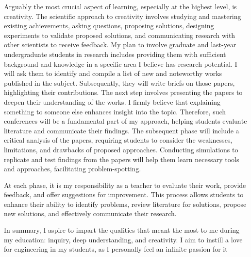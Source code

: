 Arguably the most crucial aspect of learning, especially at the highest level, is creativity. The scientific approach to creativity involves studying and mastering existing achievements, asking questions, proposing solutions, designing experiments to validate proposed solutions, and communicating research with other scientists to receive feedback. My plan to involve graduate and last-year undergraduate students in research includes providing them with sufficient background and knowledge in a specific area I believe has research potential. I will ask them to identify and compile a list of new and noteworthy works published in the subject. Subsequently, they will write briefs on those papers, highlighting their contributions. The next step involves presenting the papers to deepen their understanding of the works. I firmly believe that explaining something to someone else enhances insight into the topic. Therefore, such conferences will be a fundamental part of my approach, helping students evaluate literature and communicate their findings. The subsequent phase will include a critical analysis of the papers, requiring students to consider the weaknesses, limitations, and drawbacks of proposed approaches. Conducting simulations to replicate and test findings from the papers will help them learn necessary tools and approaches, facilitating problem-spotting.

At  each phase, it is my responsibility as a teacher to evaluate their work, provide feedback, and offer suggestions for improvement. This process allows students to enhance their ability to identify problems, review literature for solutions, propose new solutions, and effectively communicate their research.

In summary, I aspire to impart the qualities that meant the most to me during my education: inquiry, deep understanding, and creativity. I aim to instill a love for engineering in my students, as I personally feel an infinite passion for it
